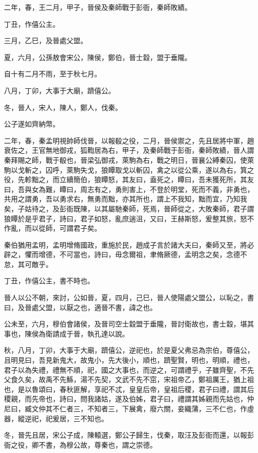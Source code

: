\begin{pinyinscope}
二年，春，王二月，甲子，晉侯及秦師戰于彭衙，秦師敗績。

丁丑，作僖公主。

三月，乙巳，及晉處父盟。

夏，六月，公孫敖會宋公，陳侯，鄭伯，晉士縠，盟于垂隴。

自十有二月不雨，至于秋七月。

八月，丁卯，大事于大廟，躋僖公。

冬，晉人，宋人，陳人，鄭人，伐秦。

公子遂如齊納幣。

二年，春，秦孟明視帥師伐晉，以報殽之役，二月，晉侯禦之，先且居將中軍，趙衰佐之，王官無地御戎，狐鞫居為右，甲子，及秦師戰于彭衙，秦師敗績，晉人謂秦拜賜之師，戰于殽也，晉梁弘御戎，萊駒為右，戰之明日，晉襄公縛秦囚，使萊駒以戈斬之，囚呼，萊駒失戈，狼瞫取戈以斬囚，禽之以從公乘，遂以為右，箕之役，先軫黜之，而立續簡伯，狼瞫怒，其友曰，盍死之，瞫曰，吾未獲死所，其友曰，吾與女為難，瞫曰，周志有之，勇則害上，不登於明堂，死而不義，非勇也，共用之謂勇，吾以勇求右，無勇而黜，亦其所也，謂上不我知，黜而宜，乃知我矣，子姑待之，及彭衙既陳，以其屬馳秦師，死焉，晉師從之，大敗秦師，君子謂狼瞫於是乎君子，詩曰，君子如怒，亂庶遄沮，又曰，王赫斯怒，爰整其旅，怒不作亂，而以從師，可謂君子矣。

秦伯猶用孟明，孟明增脩國政，重施於民，趙成子言於諸大夫曰，秦師又至，將必辟之，懼而增德，不可當也，詩曰，毋念爾祖，聿脩厥德，孟明念之矣，念德不怠，其可敵乎。

丁丑，作僖公主，書不時也。

晉人以公不朝，來討，公如晉，夏，四月，己巳，晉人使陽處父盟公，以恥之，書曰，及晉處父盟，以厭之也，適晉不書，諱之也。

公未至，六月，穆伯會諸侯，及晉司空士縠盟于垂隴，晉討衛故也，書士縠，堪其事也，陳侯為衛請成于晉，執孔達以說。

秋，八月，丁卯，大事于大廟，躋僖公，逆祀也，於是夏父弗忌為宗伯，尊僖公，且明見曰，吾見新鬼大，故鬼小，先大後小，順也，躋聖賢，明也，明順，禮也，君子以為失禮，禮無不順，祀，國之大事也，而逆之，可謂禮乎，子雖齊聖，不先父食久矣，故禹不先鯀，湯不先契，文武不先不窋，宋祖帝乙，鄭祖厲王，猶上祖也，是以魯頌曰，春秋匪解，享祀不忒，皇皇后帝，皇祖后稷，君子曰禮，謂其后稷親，而先帝也，詩曰，問我諸姑，遂及伯姊，君子曰，禮謂其姊親而先姑也，仲尼曰，臧文仲其不仁者三，不知者三，下展禽，廢六關，妾織蒲，三不仁也，作虛器，縱逆祀，祀爰居，三不知也。

冬，晉先且居，宋公子成，陳轅選，鄭公子歸生，伐秦，取汪及彭衙而還，以報彭衙之役，卿不書，為穆公故，尊秦也，謂之崇德。


\end{pinyinscope}
